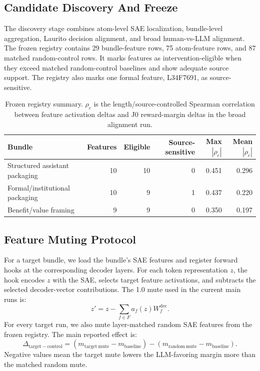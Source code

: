 \documentclass[11pt]{article}
\begin{document}
\subsection{Candidate Discovery And Freeze}

The discovery stage combines atom-level SAE localization, bundle-level
aggregation, Laurito decision alignment, and broad human-vs-LLM alignment. The
frozen registry contains 29 bundle-feature rows, 75 atom-feature rows, and 87
matched random-control rows. It marks features as intervention-eligible when
they exceed matched random-control baselines and show adequate source support.
The registry also marks one formal feature, L34F7691, as source-sensitive.

\begin{table}[h]
\centering
\small
\begin{tabular}{lrrrrr}
\toprule
Bundle & Features & Eligible & Source-sensitive & Max \(|\rho_c|\) & Mean \(|\rho_c|\) \\
\midrule
Structured assistant packaging & 10 & 10 & 0 & 0.451 & 0.296 \\
Formal/institutional packaging & 10 & 9 & 1 & 0.437 & 0.220 \\
Benefit/value framing & 9 & 9 & 0 & 0.350 & 0.197 \\
\bottomrule
\end{tabular}
\caption{Frozen registry summary. \(\rho_c\) is the length/source-controlled
Spearman correlation between feature activation deltas and J0 reward-margin
deltas in the broad alignment run.}
\label{tab:registry}
\end{table}

\subsection{Feature Muting Protocol}

For a target bundle, we load the bundle's SAE features and register forward
hooks at the corresponding decoder layers. For each token representation
\(z\), the hook encodes \(z\) with the SAE, selects target feature activations,
and subtracts the selected decoder-vector contributions. The 1.0 mute used in
the current main runs is:
\[
  z' = z - \sum_{f \in F} a_f(z) W^{\mathrm{dec}}_f.
\]
For every target run, we also mute layer-matched random SAE features from the
frozen registry. The main reported effect is:
\[
  \Delta_{\mathrm{target-control}}
  =
  \left(m_{\mathrm{target\ mute}} - m_{\mathrm{baseline}}\right)
  -
  \left(m_{\mathrm{random\ mute}} - m_{\mathrm{baseline}}\right).
\]
Negative values mean the target mute lowers the LLM-favoring margin more than
the matched random mute.
\end{document}
